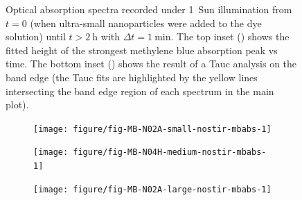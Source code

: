 \documentclass[9pt,twoside,twocolumn]{article}\usepackage{knitr}
\begin{document}
\begin{refsection}
\begin{figure}[tbp]
\begin{knitrout}
\end{knitrout}
{\label{fig-a:MB-N04H-small-nostir-photodegradation}}
{\label{fig-b:MB-N04H-small-nostir-photodegradation}}
\caption{Optical absorption spectra recorded under 1~Sun illumination from $t=0$ (when ultra-small  nanoparticles were added to the  dye solution) until $t>\qty{2}{\hour}$ with $\Delta t=\qty{1}{\minute}$.
The top inset () shows the fitted height of the strongest methylene blue absorption peak vs time.
The bottom inset () shows the result of a Tauc analysis on the band edge (the Tauc fits are highlighted by the yellow lines intersecting the band edge region of each spectrum in the main plot).}
\label{fig:MB-N04H-small-nostir-photodegradation}
\end{figure}


\begin{figure}[tbp]
\centering
\begin{subfigure}[b]{0.33\linewidth}
\caption{}%
\label{fig:MB-N02A-small-nostir-mbabs}
\begin{knitrout}\footnotesize
{}\color{fgcolor}

{\centering \texttt{[image: figure/fig-MB-N02A-small-nostir-mbabs-1]} 

}


\end{knitrout}
\end{subfigure}%
\hfill%
\begin{subfigure}[b]{0.33\linewidth}
\caption{}%
\label{fig:MB-N04H-medium-nostir-mbabs}
\begin{knitrout}\footnotesize
{}\color{fgcolor}

{\centering \texttt{[image: figure/fig-MB-N04H-medium-nostir-mbabs-1]} 

}


\end{knitrout}
\end{subfigure}%
\hfill%
\begin{subfigure}[b]{0.33\linewidth}
\caption{}%
\label{fig:MB-N02A-large-nostir-mbabs}
\begin{knitrout}\footnotesize
{}\color{fgcolor}

{\centering \texttt{[image: figure/fig-MB-N02A-large-nostir-mbabs-1]} 

}
\end{knitrout}
\end{subfigure}
\end{figure}
\end{refsection}
\end{document}
